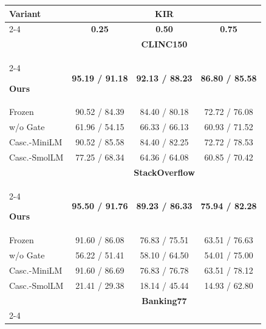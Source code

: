 \documentclass[11pt]{article}
\begin{document}
\begin{table}[t]
\centering
\footnotesize
\setlength{\tabcolsep}{4.2pt}
\renewcommand{\arraystretch}{0.96}

\begin{tabular*}{\columnwidth}{
@{\extracolsep{\fill}}
lccc
@{}
}
\toprule
\multirow{2}{*}{\textbf{Variant}}
& \multicolumn{3}{c}{\textbf{KIR}} \\
\cmidrule(lr){2-4}
& \textbf{0.25}
& \textbf{0.50}
& \textbf{0.75} \\
\midrule

& \multicolumn{3}{c}{\textbf{CLINC150}} \\
\cmidrule(lr){2-4}

\textbf{Ours}
& \textbf{95.19 / 91.18}
& \textbf{92.13 / 88.23}
& \textbf{86.80 / 85.58} \\

Frozen
& 90.52 / 84.39
& 84.40 / 80.18
& 72.72 / 76.08 \\

w/o Gate
& 61.96 / 54.15
& 66.33 / 66.13
& 60.93 / 71.52 \\

Casc.-MiniLM
& 90.52 / 85.58
& 84.40 / 82.25
& 72.72 / 78.53 \\

Casc.-SmolLM
& 77.25 / 68.34
& 64.36 / 64.08
& 60.85 / 70.42 \\

\midrule

& \multicolumn{3}{c}{\textbf{StackOverflow}} \\
\cmidrule(lr){2-4}

\textbf{Ours}
& \textbf{95.50 / 91.76}
& \textbf{89.23 / 86.33}
& \textbf{75.94 / 82.28} \\

Frozen
& 91.60 / 86.08
& 76.83 / 75.51
& 63.51 / 76.63 \\

w/o Gate
& 56.22 / 51.41
& 58.10 / 64.50
& 54.01 / 75.00 \\

Casc.-MiniLM
& 91.60 / 86.69
& 76.83 / 76.78
& 63.51 / 78.12 \\

Casc.-SmolLM
& 21.41 / 29.38
& 18.14 / 45.44
& 14.93 / 62.80 \\

\midrule

& \multicolumn{3}{c}{\textbf{Banking77}} \\
\cmidrule(lr){2-4}


\end{tabular*}
\end{table}
\end{document}
